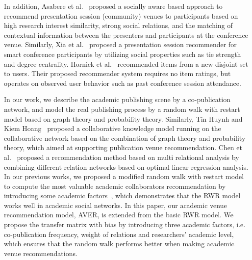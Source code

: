 \documentclass[9pt]{acm_proc_article-sp}
\begin{document}
In addition, Asabere et al.~\cite{asabere2014improving} proposed a socially aware based approach to recommend presentation session (community) venues to participants based on high research interest similarity, strong social relations, and the matching of contextual information between the presenters and participants at the conference venue. Similarly, Xia et al.~\cite{xia2013socially} proposed a presentation session recommender for smart conference participants by utilizing social properties such as tie strength and degree centrality. Hornick et al.~\cite{hornick2012extending} recommended items from a new disjoint set to users. Their proposed recommender system requires no item ratings, but operates on observed user behavior such as past conference session attendance.

In our work, we describe the academic publishing scene by a co-publication network, and model the real publishing process by a random walk with restart model based on graph theory and probability theory. Similarly, Tin Huynh and Kiem Hoang~\cite{huynh2012modeling} proposed a collaborative knowledge model running on the collaborative network based on the combination of graph theory and probability theory, which aimed at supporting publication venue recommendation. Chen et al.~\cite{chen2012social} proposed a recommendation method based on multi relational analysis by combining different relation networks based on optimal linear regression analysis. In our previous works, we proposed a modified random walk with restart model to compute the most valuable academic collaborators recommendation by introducing some academic factors~\cite{xia2014mvcwalker}, which demonstrates that the RWR model works well in academic social networks. In this paper, our academic venue recommendation model, AVER, is extended from the basic RWR model. We propose the transfer matrix with bias by introducing three academic factors, i.e. co-publication frequency, weight of relations and researchers' academic level, which ensures that the random walk performs better when making academic venue recommendations.
\end{document}
